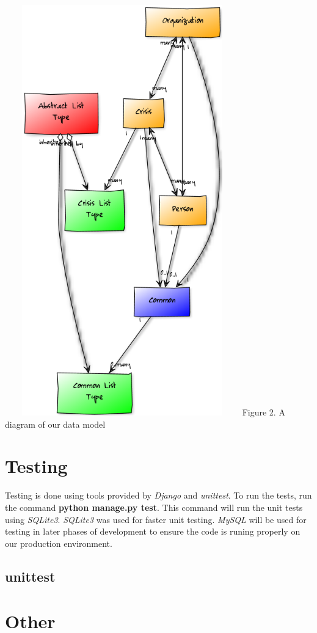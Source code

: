\documentclass[12pt]{report}
\begin{document}
\newpage
\includegraphics*[width=4in,height=7in]{dataModelDiagram.png}
\newline
\footnotesize
Figure 2. A diagram of our data model %
\normalsize
\newpage

\newpage
\section*{Testing}
Testing is done using tools provided by \emph{Django} and \emph{unittest}.
To run the tests, run the command \textbf{python manage.py test}.
This command will run the unit tests using \emph{SQLite3}.
\emph{SQLite3} was used for faster unit testing.
\emph{MySQL} will be used for testing in later phases of development to ensure the code is runing properly on our production environment.

\subsection*{unittest}


\newpage
\section*{Other}
\end{document}
